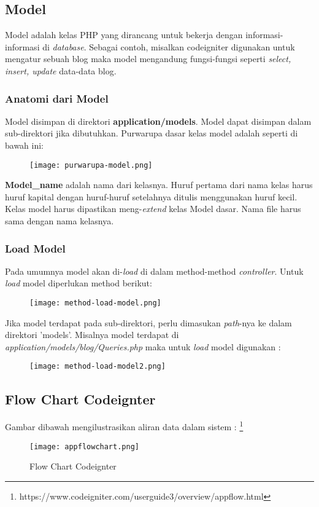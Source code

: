 \subsection{Model}
Model adalah kelas PHP yang dirancang untuk bekerja dengan informasi-informasi di \textit{database}. Sebagai contoh, misalkan codeigniter digunakan untuk mengatur sebuah blog maka model mengandung fungsi-fungsi seperti \textit{select, insert, update }data-data blog.

\subsubsection{Anatomi dari Model}
Model disimpan di direktori \textbf{application/models}. Model dapat disimpan dalam sub-direktori jika dibutuhkan. Purwarupa dasar kelas model adalah seperti di bawah ini:
\begin{figure} [H]
	\centering  
	\texttt{[image: purwarupa-model.png]}  
	\label{fig:purwarupa-model} 
\end{figure}
\textbf{Model\_name} adalah nama dari kelasnya. Huruf pertama dari nama kelas harus huruf kapital dengan huruf-huruf setelahnya ditulis menggunakan huruf kecil. Kelas model harus dipastikan meng-\textit{extend} kelas Model dasar. Nama file harus sama dengan nama kelasnya.

\subsubsection{Load Model}
Pada umumnya model akan di-\textit{load} di dalam method-method \textit{controller}. Untuk \textit{load} model diperlukan method berikut:
\begin{figure} [H]
	\centering  
	\texttt{[image: method-load-model.png]}  
	\label{fig:method-load-model} 
\end{figure}
Jika model terdapat pada sub-direktori, perlu dimasukan \textit{path}-nya ke dalam direktori 'models'. Misalnya model terdapat di \textit{application/models/blog/Queries.php} maka untuk \textit{load} model digunakan :
\begin{figure} [H]
	\centering  
	\texttt{[image: method-load-model2.png]}  
	\label{fig:method-load-model2} 
\end{figure}


\subsection{Flow Chart Codeignter}
Gambar dibawah mengilustrasikan aliran data dalam sistem : \footnote{https://www.codeigniter.com/userguide3/overview/appflow.html}
\begin{figure} [H]
	\centering  
	\texttt{[image: appflowchart.png]}  
	\caption[Flow Chart Codeignter]{Flow Chart Codeignter} 
	\label{fig:flow-chart-codeigniter} 
\end{figure}

